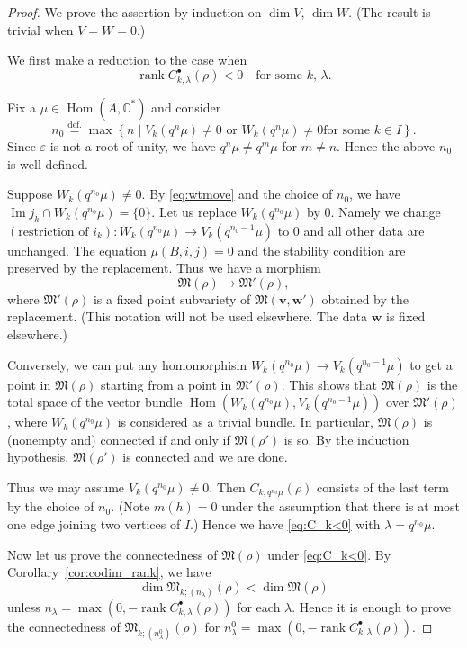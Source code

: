 \documentclass[12pt]{amsart}
\def\Bbb{\mathbb}
\def\frak{\mathfrak}
\theoremstyle{definition}
\theoremstyle{remark}
\numberwithin{equation}{subsection}
\newcommand{\corref}[1]{Corollary~\ref{#1}}
\newcommand{\defeq}{\overset{\operatorname{\scriptstyle def.}}{=}}
\newcommand{\C}{{\Bbb C}}
\newcommand{\Hom}{\operatorname{Hom}}
\newcommand{\Ima}{\operatorname{Im}}
\newcommand{\rank}{\operatorname{rank}}
\newcommand{\M}{{\frak M}} %
\newcommand{\bv}{{\mathbf v}} %
\newcommand{\bw}{{\mathbf w}} %
\begin{document}
\begin{proof}
We prove the assertion by induction on $\dim V$, $\dim W$. (The result is
trivial when $V = W = 0$.)

We first make a reduction to the case when
\begin{equation}\label{eq:C_k<0}
   \rank C_{k,\lambda}^\bullet(\rho) < 0 \quad\text{for some $k$, $\lambda$}.
\end{equation}

Fix a $\mu\in\Hom(A,\C^*)$ and consider
\begin{equation*}
   n_0 \defeq \max\left\{ n \mid
     \text{$V_k(q^n\mu)\neq 0$ or $W_k(q^n\mu)\neq 0$
   for some $k\in I$}\right\}.
\end{equation*}
Since $\varepsilon$ is not a root of unity, we have $q^n\mu\neq
q^m\mu$ for $m\neq n$. Hence the above $n_0$ is well-defined.

Suppose $W_k(q^{n_0}\mu)\neq 0$. By \eqref{eq:wtmove} and the choice
of $n_0$, we have $\Ima j_k\cap W_k(q^{n_0}\mu) = \{ 0\}$.
%
Let us replace $W_k(q^{n_0}\mu)$ by $0$. Namely we
change $(\text{restriction of $i_k$})\colon W_k(q^{n_0}\mu)\to
V_k(q^{n_0-1}\mu)$ to $0$ and all other data are unchanged.
%
The equation $\mu(B,i,j) = 0$ and the stability condition are
preserved by the replacement. Thus we have a morphism
\begin{equation*}
   \M(\rho) \to \M'(\rho),
\end{equation*}
where $\M'(\rho)$ is a fixed point subvariety
of $\M(\bv,\bw')$ obtained by the replacement.
(This notation will not be used elsewhere. The data $\bw$ is fixed
elsewhere.)

Conversely, we can put any homomorphism $W_k(q^{n_0}\mu)\to
V_k(q^{n_0-1}\mu)$ to get a point in $\M(\rho)$ starting from a point
in $\M'(\rho)$. This shows that $\M(\rho)$ is the total space of the
vector bundle $\Hom(W_k(q^{n_0}\mu), V_k(q^{n_0-1}\mu))$ over
$\M'(\rho)$, where $W_k(q^{n_0}\mu)$ is considered as a trivial
bundle. In particular, $\M(\rho)$ is (nonempty and) connected if and
only if $\M(\rho')$ is so. By the induction hypothesis, $\M(\rho')$ is
connected and we are done.

Thus we may assume $V_k(q^{n_0}\mu)\neq 0$.
Then $C_{k,q^{n_0}\mu}(\rho)$
consists of the last term by the choice of $n_0$. 
(Note $m(h) = 0$ under the assumption that there is at most
one edge joining two vertices of $I$.)
Hence we have
\eqref{eq:C_k<0} with $\lambda = q^{n_0}\mu$.

Now let us prove the connectedness of $\M(\rho)$ under
\eqref{eq:C_k<0}.
By \corref{cor:codim_rank}, we have
\begin{equation*}
   \dim \M_{k;(n_\lambda)}(\rho) < \dim \M(\rho)
\end{equation*}
unless $n_\lambda = \max\left(0,
-\rank C_{k,\lambda}^\bullet(\rho)\right)$ for each $\lambda$.
Hence it is enough to prove the connectedness of
$\M_{k;(n_\lambda^0)}(\rho)$ for
$n_\lambda^0 = \max\left(0,
-\rank C_{k,\lambda}^\bullet(\rho)\right)$.


\end{proof}
\end{document}
